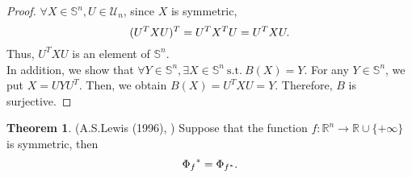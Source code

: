 \documentclass[a4paper,11pt, oneside]{book}
\theoremstyle{definition}
\newtheorem{thm}[dfn]{Theorem}
\newcommand{\RealNumberSet}{\mathbb{R}}
\newcommand{\NDemenstionalRealEuclideanSpace}{\mathbb{R}^n}
\newcommand{\NDemenstionalRealSymmetricMatrixSpace}{\mathbb{S}^n}
\newcommand{\ExtendedRealValuedFunction}[2]{{#1}: {#2} \to \RealNumberSet \cup \{+\infty\}}
\newcommand{\SuchThat}{\:\text{s.t.}\:}
\begin{document}
\begin{proof}
  $\forall X \in \NDemenstionalRealSymmetricMatrixSpace, U \in \mathcal{U}_n$, since $X$ is symmetric,
  \begin{equation}
    (U^TXU)^T = U^TX^TU = U^TXU. \notag
  \end{equation}
  Thus, $U^TXU$ is an element of $\NDemenstionalRealSymmetricMatrixSpace$. \\
  In addition, we show that  $\forall Y \in \NDemenstionalRealSymmetricMatrixSpace, \exists X \in \NDemenstionalRealSymmetricMatrixSpace \SuchThat B(X) = Y$. For any $Y \in \NDemenstionalRealSymmetricMatrixSpace$, we put $X = UYU^T$. Then, we obtain $B(X) = U^TXU = Y$. Therefore, $B$ is surjective.
\end{proof}

\begin{thm}{(A.S.Lewis (1996), \cite{Lewis96})}
  Suppose that the function $\ExtendedRealValuedFunction{f}{\NDemenstionalRealEuclideanSpace}$ is symmetric, then
  \begin{equation}
    {\Phi_{f}}^* = \Phi_{f^*}. \notag
  \end{equation}
\end{thm}
\end{document}
